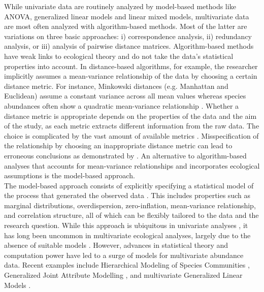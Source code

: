 \documentclass[a4paper,11pt]{article}
\begin{document}
    While univariate data are routinely analyzed by model-based methods like ANOVA, generalized linear models and linear mixed models, multivariate data are most often analyzed with algorithm-based methods.
    Most of the latter are variations on three basic approaches: i) correspondence analysis, ii) redundancy analysis, or iii) analysis of pairwise distance matrices. 
    Algorithm-based methods have weak links to ecological theory and do not take the data's statistical properties into account. 
    In distance-based algorithms, for example, the researcher implicitly assumes a mean-variance relationship of the data by choosing a certain distance metric. 
	For instance, Minkowski distances (e.g. Manhattan and Euclidean) assume a constant variance across all mean values \citep{TerBraak1988}
	whereas species abundances often show a quadratic mean-variance relationship \citep{routledge1991taylor, yamamura1999transformation}.
	Whether a distance metric is appropriate depends on the properties of the data and the aim of the study, as each metric extracts different information from the raw data. 
	The choice is complicated by the vast amount of available metrics \citep[see][]{Legendre2012}.
	Misspecification of the relationship by choosing an inappropriate distance metric can lead to erroneous conclusions as demonstrated by \citet{Warton2012}.
	An alternative to algorithm-based analyses that accounts for mean-variance relationships and incorporates ecological assumptions is the model-based approach.\\
 


	The model-based approach consists of explicitly specifying a statistical model of the process that generated the observed data \citep{Warton2015a}.
	This includes properties such as marginal distributions, overdispersion, zero-inflation, mean-variance relationship, and correlation structure, all of which can be flexibly tailored to the data and the research question.
	While this approach is ubiquitous in univariate analyses \citep[e.g.][]{bolker2008ecological, zuur2010protocol}, it has long been uncommon in multivariate ecological analyses, largely due to the absence of suitable models \citep{anderson2001new}.
    However, advances in statistical theory and computation power have led to a surge of models for multivariate abundance data. 
	Recent examples include Hierarchical Modeling of Species Communities \citep{Ovaskainen2017}, Generalized Joint 
	Attribute Modelling \citep{Clark2017},  and multivariate Generalized Linear Models \citep[MvGLM,][]{Warton2012}.
	
\end{document}
